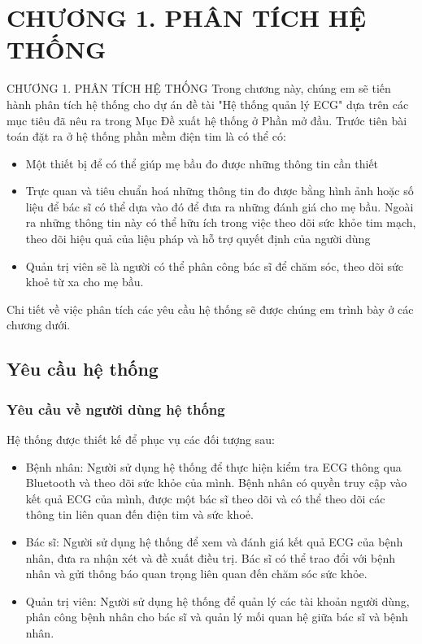 
\section*{CHƯƠNG 1. PHÂN TÍCH HỆ THỐNG}
\setcounter{section}{1}
\setcounter{subsection}{0} %
\setcounter{table}{0} %
\setcounter{figure}{0} %
{\numberline{}CHƯƠNG 1. PHÂN TÍCH HỆ THỐNG}
Trong chương này, chúng em sẽ tiến hành phân tích hệ thống cho dự án đề tài "Hệ thống quản lý ECG" dựa trên các mục tiêu
đã nêu ra trong Mục Đề xuất hệ thống ở Phần mở đầu. Trước tiên bài toán đặt ra ở hệ thống phần mềm điện tim là có thể có:

\begin{itemize}
  \item Một thiết bị để có thể giúp mẹ bầu đo được những thông tin cần thiết
  \item Trực quan và tiêu chuẩn hoá những thông tin đo được
    bằng hình ảnh hoặc số liệu để bác sĩ có thể dựa vào đó để đưa ra những đánh giá cho mẹ bầu. Ngoài ra những thông tin này
    có thể hữu ích trong việc theo dõi sức khỏe tim mạch, theo dõi hiệu quả của liệu pháp 
    và hỗ trợ quyết định của người dùng
  \item Quản trị viên sẽ là người có thể phân công bác sĩ để chăm sóc, theo dõi sức khoẻ từ
  xa cho mẹ bầu. 
\end{itemize}

Chi tiết về việc phân tích các yêu cầu hệ thống sẽ được chúng em trình bày ở các chương dưới.


\subsection{Yêu cầu hệ thống}
\subsubsection{Yêu cầu về người dùng hệ thống}
Hệ thống được thiết kế để phục vụ các đối tượng sau:

\begin{itemize}
    \item Bệnh nhân: Người sử dụng hệ thống để thực hiện kiểm tra ECG thông qua Bluetooth và theo dõi sức khỏe của mình. Bệnh nhân có quyền truy cập vào kết quả ECG của mình, được một bác sĩ theo dõi và có thể theo dõi các thông tin liên quan đến điện tim và sức khoẻ.
    \item Bác sĩ: Người sử dụng hệ thống để xem và đánh giá kết quả ECG của bệnh nhân, đưa ra nhận xét và đề xuất điều trị. Bác sĩ có thể trao đổi với bệnh nhân và gửi thông báo quan trọng liên quan đến chăm sóc sức khỏe.
    \item Quản trị viên: Người sử dụng hệ thống để quản lý các tài khoản người dùng, phân công bệnh nhân cho bác sĩ và quản lý mối quan hệ giữa bác sĩ và bệnh nhân.
\end{itemize}

